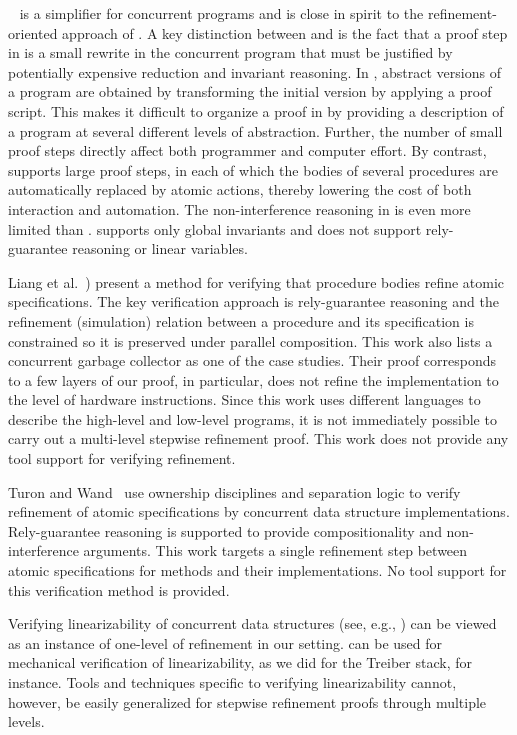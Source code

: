 \QED~\cite{ElmasQT09} is a simplifier for concurrent programs and is close in spirit to the 
refinement-oriented approach of \civl.
A key distinction between \civl and \QED is the fact that a proof step in \QED is a small rewrite in the concurrent program
that must be justified by potentially expensive reduction and invariant reasoning.
In \QED, abstract versions of a program are obtained by transforming the initial
version by applying a proof script. 
This makes it difficult to organize a proof in \QED by providing a
description of a program at several different levels of abstraction. 
Further, the number of small proof steps directly affect both programmer
and computer effort. 
By contrast, \civl supports large proof steps, in each of which the bodies of several procedures
are automatically replaced by atomic actions, thereby lowering the cost of both interaction and automation.
The non-interference reasoning in \QED is even more limited than \calvin.
\QED supports only global invariants and does not support rely-guarantee reasoning or linear variables.

Liang et al.~\cite{LiangRGSim}) present a method for verifying that procedure
bodies refine atomic specifications. 
The key verification approach is
rely-guarantee reasoning and the refinement (simulation) relation between
a procedure and its specification is constrained so it is preserved under
parallel composition. 
This work also lists a concurrent garbage collector as one of the case
studies. 
Their proof corresponds to a few layers of our proof, in particular,
does not refine the implementation to the level of hardware
instructions. 
Since this work uses different languages to describe the high-level
and low-level programs, it is not immediately possible to carry out a
multi-level stepwise refinement proof. 
This work does not provide any tool support for verifying refinement. 

Turon and Wand~\cite{TuronM11} use ownership disciplines and
separation logic to verify refinement of atomic specifications by 
concurrent data structure implementations. 
Rely-guarantee reasoning is
supported to provide compositionality and non-interference
arguments. 
This work targets a single refinement step between atomic
specifications for methods and their implementations. 
No tool support for this verification method is provided. 

Verifying linearizability of concurrent data structures (see, e.g.,
\cite{tacasLin,aliLin}) can be viewed as an instance of one-level of
refinement in our setting. 
\civl can be used for mechanical
verification of linearizability, as we did for the Treiber stack, for
instance. 
Tools and techniques specific to verifying linearizability
cannot, however, be easily generalized for stepwise refinement proofs
through multiple levels. 

